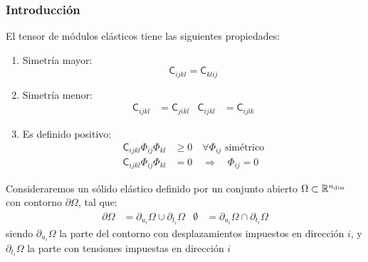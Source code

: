 \documentclass{beamer}
\begin{document}
\begin{frame}
\frametitle{Introducción}
El tensor de módulos elásticos tiene las siguientes propiedades:
\begin{enumerate}
\item Simetría mayor:
\begin{equation}
\mathsf{C}_{ijkl}=\mathsf{C}_{klij} \label{scmayor}
\end{equation}
\item Simetría menor:
\begin{align}
\mathsf{C}_{ijkl}&=\mathsf{C}_{jikl} &
\mathsf{C}_{ijkl}&=\mathsf{C}_{ijlk}
\end{align}
\item Es definido positivo:
\begin{align}
\mathsf{C}_{ijkl} \Phi_{ij} \Phi_{kl}& \geq 0 \quad \forall \Phi_{ij}
\textrm{ simétrico} \label{sfcdpos1}\\
\mathsf{C}_{ijkl} \Phi_{ij} \Phi_{kl} &=0 \quad \Rightarrow \quad
\Phi_{ij}=0 \label{sfcdpos2}
\end{align}
\end{enumerate}
Consideraremos un sólido elástico definido por un conjunto abierto
$\Omega \subset \mathbb{R}^{n_{\rm dim}}$ con contorno
$\partial \Omega$, tal que:
\begin{align}
\partial \Omega &=\partial_{u_i} \Omega \cup \partial_{t_i} \Omega &
\emptyset       &=\partial_{u_i} \Omega \cap \partial_{t_i} \Omega
\end{align}
siendo $\partial_{u_i} \Omega$ la parte del contorno con desplazamientos
impuestos en dirección $i$, y $\partial_{t_i} \Omega$ la parte con tensiones
impuestas en dirección $i$
\end{frame}

\end{document}
